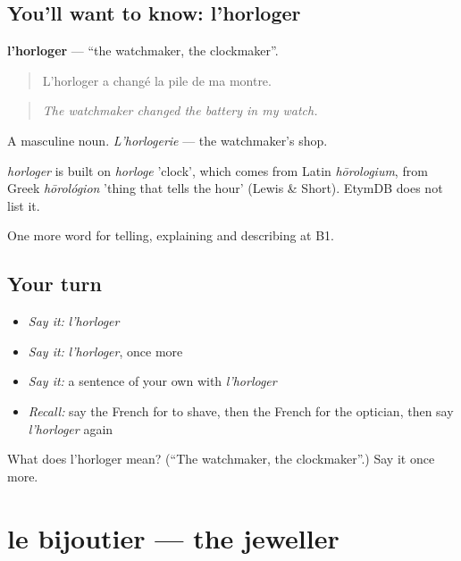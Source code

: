 \subsection*{You'll want to know: l'horloger}
\textbf{l'horloger} — \textquotedblleft{}the watchmaker, the clockmaker\textquotedblright{}.

\begin{quote}
L'horloger a changé la pile de ma montre.
\end{quote}

\begin{quote}
\emph{The watchmaker changed the battery in my watch.}
\end{quote}

A masculine noun. \emph{L'horlogerie} — the watchmaker's shop.

\begin{cousinweb}
\emph{horloger} is built on \emph{horloge} 'clock', which comes from Latin \emph{hōrologium}, from Greek \emph{hōrológion} 'thing that tells the hour' (Lewis \& Short). EtymDB does not list it.
\end{cousinweb}

\begin{grammarlens}[title={What you've built}]
One more word for telling, explaining and describing at B1.
\end{grammarlens}

\subsection*{Your turn}
\begin{itemize}
\raggedright
  \item \emph{Say it:} \emph{l'horloger}
  \item \emph{Say it:} \emph{l'horloger}, once more
  \item \emph{Say it:} a sentence of your own with \emph{l'horloger}
  \item \emph{Recall:} say the French for to shave, then the French for the optician, then say \emph{l'horloger} again
\end{itemize}

\begin{tcolorbox}[breakable,colback=teal!4,colframe=teal!35!black,title={Before you move on}]
What does l'horloger mean? (\textquotedblleft{}The watchmaker, the clockmaker\textquotedblright{}.) Say it once more.
\end{tcolorbox}
\section[le bijoutier]{le bijoutier — the jeweller}

